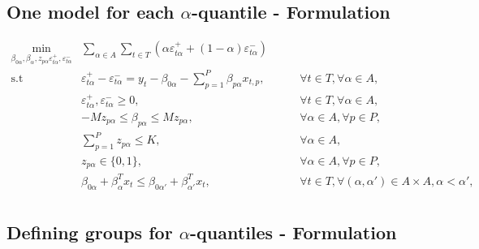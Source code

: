 \subsection{\texorpdfstring{One model for each \(\alpha\)-quantile -
Formulation}{One model for each \textbackslash{}alpha-quantile - Formulation}}\label{one-model-for-each-alpha-quantile---formulation}

\tiny

\begin{eqnarray}
 \underset{\beta_{0\alpha},\beta_\alpha,z_{p \alpha} \varepsilon_{t \alpha}^{+},\varepsilon_{t \alpha}^{-}}{\text{min}} & \sum_{\alpha \in A} \sum_{t\in T}\left(\alpha\varepsilon_{t \alpha}^{+}+(1-\alpha)\varepsilon_{t\alpha}^{-}\right) \label{eq:mip0} \\
\mbox{s.t } & \varepsilon_{t \alpha}^{+}-\varepsilon_{t \alpha}^{-}=y_{t}-\beta_{0 \alpha}-\sum_{p=1}^{P}\beta_{p \alpha}x_{t,p},& \qquad\forall t \in T ,\forall \alpha \in A, \label{eq:mip1}\\
& \varepsilon_{t \alpha}^{+},\varepsilon_{t \alpha}^{-}\geq0,&\qquad\forall t \in T ,\forall \alpha \in A, \label{eq:mip2}\\
& - M z_{p \alpha} \leq \beta_{p \alpha} \leq M z_{p \alpha},&\qquad \forall \alpha \in A, \forall p\in P, \label{eq:mip3}\\
& \sum_{p=1}^P z_{p \alpha} \leq K, & \qquad \forall \alpha \in A, \label{eq:mip4}\\
& z_{p \alpha} \in \{0,1\},&\qquad \forall \alpha \in A, \forall p\in P, \label{eq:mip5}\\
& \beta_{0\alpha} + \beta_{\alpha}^T x_{t} \leq \beta_{0\alpha'} + \beta_{\alpha'}^T x_{t}, & \qquad \forall t \in T, \forall (\alpha, \alpha') \in A \times A,  \alpha < \alpha',\nonumber\\ \label{eq:mip6}
\end{eqnarray}

\subsection{\texorpdfstring{Defining groups for \(\alpha\)-quantiles -
Formulation}{Defining groups for \textbackslash{}alpha-quantiles - Formulation}}\label{defining-groups-for-alpha-quantiles---formulation}

\tiny

